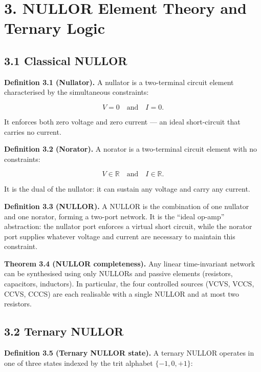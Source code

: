 \section{3. NULLOR Element Theory and Ternary Logic}\label{fa_84:nullor-theory}

\subsection{3.1 Classical NULLOR}

\textbf{Definition 3.1 (Nullator).} A nullator is a two-terminal
circuit element characterised by the simultaneous constraints:

\[
V = 0 \quad\text{and}\quad I = 0.
\]

It enforces both zero voltage and zero current --- an ideal
short-circuit that carries no current.

\textbf{Definition 3.2 (Norator).} A norator is a two-terminal
circuit element with no constraints:

\[
V \in \mathbb{R} \quad\text{and}\quad I \in \mathbb{R}.
\]

It is the dual of the nullator: it can sustain any voltage and carry
any current.

\textbf{Definition 3.3 (NULLOR).} A NULLOR is the combination of one
nullator and one norator, forming a two-port network. It is the
``ideal op-amp'' abstraction: the nullator port enforces a virtual
short circuit, while the norator port supplies whatever voltage and
current are necessary to maintain this constraint.

\textbf{Theorem 3.4 (NULLOR completeness).} Any linear time-invariant
network can be synthesised using only NULLORs and passive elements
(resistors, capacitors, inductors). In particular, the four
controlled sources (VCVS, VCCS, CCVS, CCCS) are each realisable with
a single NULLOR and at most two resistors.

\subsection{3.2 Ternary NULLOR}

\textbf{Definition 3.5 (Ternary NULLOR state).} A ternary NULLOR
operates in one of three states indexed by the trit alphabet
\(\{-1, 0, +1\}\):

